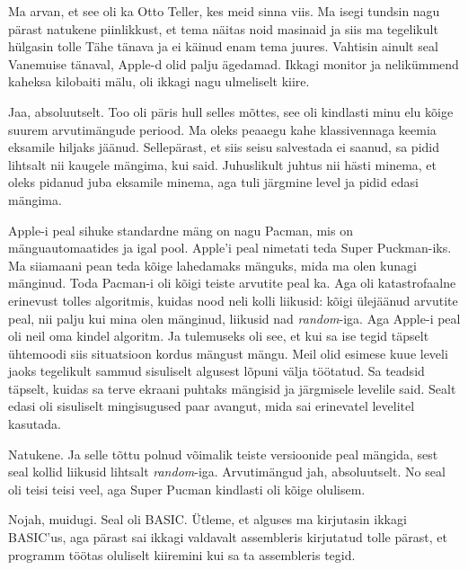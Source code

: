 Ma arvan, et see oli ka Otto Teller, kes meid sinna viis. Ma isegi tundsin nagu 
pärast natukene piinlikkust, et tema näitas noid masinaid ja siis ma tegelikult 
hülgasin tolle Tähe tänava ja ei käinud enam tema juures. Vahtisin ainult seal 
Vanemuise tänaval, Apple-d olid palju  ägedamad. Ikkagi monitor ja nelikümmend 
kaheksa kilobaiti mälu, oli ikkagi nagu ulmeliselt kiire.


Jaa,  absoluutselt. Too oli päris hull selles mõttes, see oli kindlasti minu 
elu kõige suurem arvutimängude periood. Ma oleks peaaegu kahe klassivennaga 
keemia eksamile hiljaks jäänud. Sellepärast, et siis seisu salvestada  ei 
saanud, sa pidid lihtsalt nii kaugele mängima, kui said. Juhuslikult juhtus 
nii hästi minema, et oleks pidanud juba eksamile minema, aga tuli järgmine 
level ja pidid edasi mängima.


Apple-i peal sihuke standardne mäng on nagu Pacman, mis on mänguautomaatides ja 
igal pool. Apple'i peal nimetati teda Super Puckman-iks. Ma siiamaani pean teda kõige lahedamaks mänguks, mida ma olen kunagi 
mänginud. Toda Pacman-i oli kõigi teiste arvutite peal ka. Aga 
  oli  katastrofaalne  erinevust tolles algoritmis, kuidas nood 
neli kolli liikusid: kõigi ülejäänud arvutite peal, nii palju kui mina olen 
mänginud, liikusid nad \emph{random}-iga. Aga Apple-i peal oli neil oma kindel 
algoritm. Ja tulemuseks oli see, et kui sa ise tegid täpselt ühtemoodi siis 
situatsioon kordus mängust mängu. Meil olid esimese kuue 
leveli jaoks tegelikult sammud sisuliselt algusest lõpuni välja töötatud. Sa 
teadsid täpselt, 
kuidas sa terve ekraani puhtaks mängisid ja järgmisele levelile said. 
Sealt edasi oli sisuliselt mingisugused paar avangut, mida sai erinevatel 
levelitel kasutada.


Natukene. Ja selle tõttu polnud võimalik teiste versioonide peal mängida, sest 
seal kollid liikusid lihtsalt  \emph{random}-iga. Arvutimängud jah, 
absoluutselt. No seal oli teisi teisi veel, aga Super Pucman kindlasti oli 
kõige olulisem.


Nojah, muidugi. Seal oli BASIC. Ütleme, et alguses ma 
kirjutasin ikkagi BASIC'us, aga pärast sai ikkagi valdavalt 
assembleris kirjutatud tolle pärast, et programm töötas 
oluliselt kiiremini kui sa ta assembleris tegid. 

